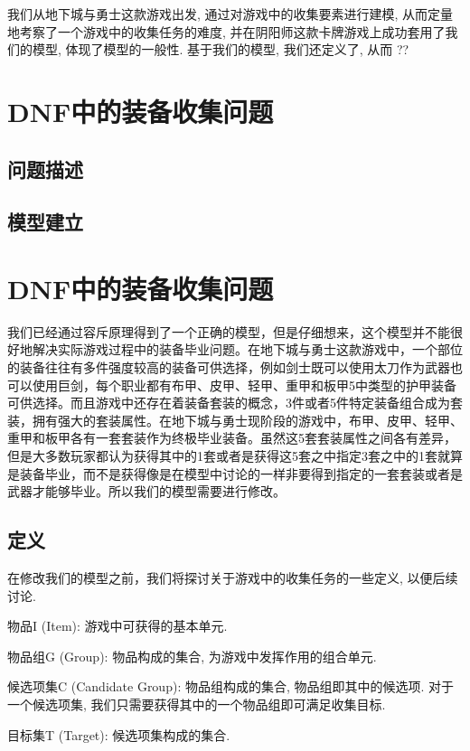 \documentclass[10pt,journal,compsoc]{IEEEtran}
\begin{document}
  我们从地下城与勇士这款游戏出发, 通过对游戏中的收集要素进行建模, 从而定量地考察了一个游戏中的收集任务的难度, 并在阴阳师这款卡牌游戏上成功套用了我们的模型, 体现了模型的一般性. 基于我们的模型, 我们还定义了, 从而 ??

\section{DNF中的装备收集问题}

\subsection{问题描述}

\subsection{模型建立}


\section{DNF中的装备收集问题}
  我们已经通过容斥原理得到了一个正确的模型，但是仔细想来，这个模型并不能很好地解决实际游戏过程中的装备毕业问题。在地下城与勇士这款游戏中，一个部位的装备往往有多件强度较高的装备可供选择，例如剑士既可以使用太刀作为武器也可以使用巨剑，每个职业都有布甲、皮甲、轻甲、重甲和板甲5中类型的护甲装备可供选择。而且游戏中还存在着装备套装的概念，3件或者5件特定装备组合成为套装，拥有强大的套装属性。在地下城与勇士现阶段的游戏中，布甲、皮甲、轻甲、重甲和板甲各有一套套装作为终极毕业装备。虽然这5套套装属性之间各有差异，但是大多数玩家都认为获得其中的1套或者是获得这5套之中指定3套之中的1套就算是装备毕业，而不是获得像是在模型中讨论的一样非要得到指定的一套套装或者是武器才能够毕业。所以我们的模型需要进行修改。


  \subsection{定义}

  在修改我们的模型之前，我们将探讨关于游戏中的收集任务的一些定义, 以便后续讨论. 
  
  物品I (Item): 游戏中可获得的基本单元.
  
  物品组G (Group): 物品构成的集合, 为游戏中发挥作用的组合单元.
  
  候选项集C (Candidate Group): 物品组构成的集合, 物品组即其中的候选项. 对于一个候选项集, 我们只需要获得其中的一个物品组即可满足收集目标. 
  
  目标集T (Target): 候选项集构成的集合.
  
\end{document}
